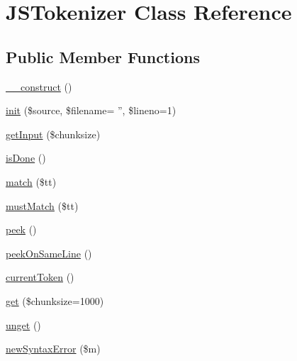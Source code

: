 \hypertarget{classJSTokenizer}{\section{J\+S\+Tokenizer Class Reference}
\label{classJSTokenizer}
}
\subsection*{Public Member Functions}
\begin{DoxyCompactItemize}
\item 
\hyperlink{classJSTokenizer_af1139365b80d9a2783657b84ab71fcfa}{\+\_\+\+\_\+construct} ()
\item 
\hyperlink{classJSTokenizer_a68e6e6ac717b475f2e10cd26662ed0bb}{init} (\$source, \$filename= '', \$lineno=1)
\item 
\hyperlink{classJSTokenizer_a299da2b16d30791cc502a39aff2be728}{get\+Input} (\$chunksize)
\item 
\hyperlink{classJSTokenizer_ac7b84a72f08a169e9de3d998f22e1203}{is\+Done} ()
\item 
\hyperlink{classJSTokenizer_a2036ce0f0469a2ab32d036d63c4e3008}{match} (\$tt)
\item 
\hyperlink{classJSTokenizer_af61e1ca8232854de254bf3e5204e9fbe}{must\+Match} (\$tt)
\item 
\hyperlink{classJSTokenizer_ac175691919588de81cc124c55712f0b7}{peek} ()
\item 
\hyperlink{classJSTokenizer_ac091f7016d138d343f4834e9fce655fd}{peek\+On\+Same\+Line} ()
\item 
\hyperlink{classJSTokenizer_aae403e7dda527870c44a033325fdb038}{current\+Token} ()
\item 
\hyperlink{classJSTokenizer_adaad50af773349b2c07b65fb00227ff9}{get} (\$chunksize=1000)
\item 
\hyperlink{classJSTokenizer_a8c6a3454fce28cd3a274d43cb3dd3273}{unget} ()
\item 
\hyperlink{classJSTokenizer_af9120f449f1744b2bf3c7d68f9a8cccd}{new\+Syntax\+Error} (\$m)
\end{DoxyCompactItemize}
